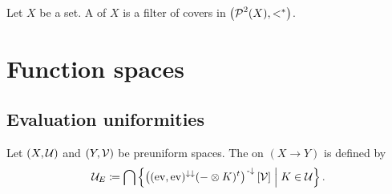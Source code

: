 \begin{definition}
Let $X$ be a set. A  of $X$ is a filter of covers in $\left( \operatorname{\mathcal{P}}^2(X), <^* \right)$.
\end{definition}

\section{Function spaces}
\subsection{Evaluation uniformities}
\begin{definition}
Let $\left( X, \mathcal{U} \right)$ and $\left( Y,\mathcal{V} \right)$ be preuniform spaces. The  on $(X\to Y)$ is defined by
\[ \mathcal{U}_E \coloneqq \bigcap \left\{ \left((\operatorname{ev}, \operatorname{ev})^{\downarrow\downarrow}(-\otimes K)^t\right)^{{\text{\hspace{0.15em}-}\downarrow}}[\mathcal{V}]  \;\middle|\; K\in\mathcal{U} \right\}. \]
\end{definition}

